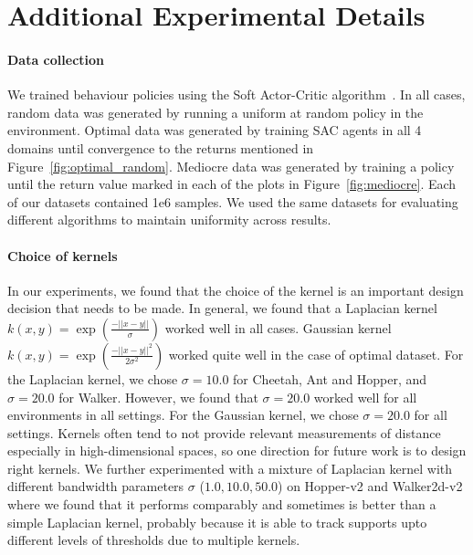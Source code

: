 


\section{Additional Experimental Details}
\label{app:additional_details}
\paragraph{Data collection} We trained behaviour policies using the Soft Actor-Critic algorithm~\cite{haarnoja2018sac}. In all cases, random data was generated by running a uniform at random policy in the environment. Optimal data was generated by training SAC agents in all 4 domains until convergence to the returns mentioned in Figure~\ref{fig:optimal_random}. Mediocre data was generated by training a policy until the return value marked in each of the plots in Figure~\ref{fig:mediocre}. Each of our datasets contained 1e6 samples. We used the same datasets for evaluating different algorithms to maintain uniformity across results.

\paragraph{Choice of kernels} In our experiments, we found that the choice of the kernel is an important design decision that needs to be made. In general, we found that a Laplacian kernel $k(x, y) = \exp(\frac{-||x - y||}{\sigma})$ worked well in all cases. Gaussian kernel $k(x, y) =\exp(\frac{-||x - y||^2}{2 \sigma^2})$ worked quite well in the case of optimal dataset. For the Laplacian kernel, we chose $\sigma = 10.0$ for Cheetah, Ant and Hopper, and $\sigma=20.0$ for Walker. However, we found that $\sigma=20.0$ worked well for all environments in all settings. For the Gaussian kernel, we chose $\sigma=20.0$ for all settings. Kernels often tend to not provide relevant measurements of distance especially in high-dimensional spaces, so one direction for future work is to design right kernels. We further experimented with a mixture of Laplacian kernel with different bandwidth parameters $\sigma$ ($1.0, 10.0, 50.0$) on Hopper-v2 and Walker2d-v2 where we found that it performs comparably and sometimes is better than a simple Laplacian kernel, probably because it is able to track supports upto different levels of thresholds due to multiple kernels.   

